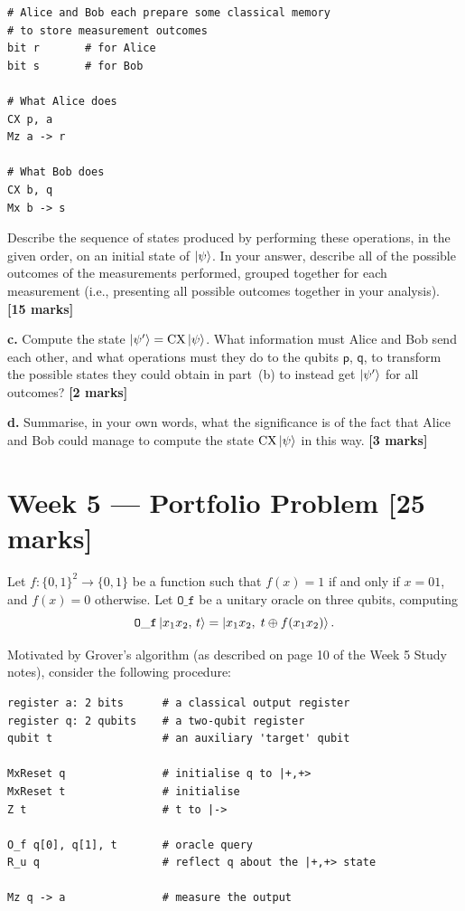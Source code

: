 \documentclass[12pt,a4paper]{article}
\begin{document}
\begin{lstlisting}[style=pseudocode]
# Alice and Bob each prepare some classical memory
# to store measurement outcomes
bit r       # for Alice
bit s       # for Bob

# What Alice does
CX p, a
Mz a -> r

# What Bob does
CX b, q
Mx b -> s
\end{lstlisting}

Describe the sequence of states produced by performing these operations, in the given order, on an
initial state of $\ket{\psi}$. In your answer, describe all of the possible outcomes of the
measurements performed, grouped together for each measurement (i.e., presenting all possible
outcomes together in your analysis).
\hfill\textbf{[15 marks]}

\medskip
\textbf{c.}
Compute the state $\ket{\psi'} = \mathrm{CX}\ket{\psi}$. What information must Alice and Bob send
each other, and what operations must they do to the qubits $\mathsf{p}$, $\mathsf{q}$, to
transform the possible states they could obtain in part~(b) to instead get $\ket{\psi'}$ for all
outcomes?
\hfill\textbf{[2 marks]}

\medskip
\textbf{d.}
Summarise, in your own words, what the significance is of the fact that Alice and Bob could manage
to compute the state $\mathrm{CX}\ket{\psi}$ in this way.
\hfill\textbf{[3 marks]}

\section*{Week 5 --- Portfolio Problem \hfill [25 marks]}

Let $f:\{0,1\}^2\to\{0,1\}$ be a function such that $f(x)=1$ if and only if $x=01$, and $f(x)=0$
otherwise. Let $\mathtt{O\_f}$ be a unitary oracle on three qubits, computing
\[
  \mathtt{O\_f}\ket{x_1 x_2,\,t} = \ket{x_1 x_2,\;t\oplus f(x_1 x_2)}.
\]

Motivated by Grover's algorithm (as described on page 10 of the Week 5 Study notes), consider the
following procedure:

\begin{lstlisting}[style=pseudocode]
register a: 2 bits      # a classical output register
register q: 2 qubits    # a two-qubit register
qubit t                 # an auxiliary 'target' qubit

MxReset q               # initialise q to |+,+>
MxReset t               # initialise
Z t                     # t to |->

O_f q[0], q[1], t       # oracle query
R_u q                   # reflect q about the |+,+> state

Mz q -> a               # measure the output
\end{lstlisting}
\end{document}
